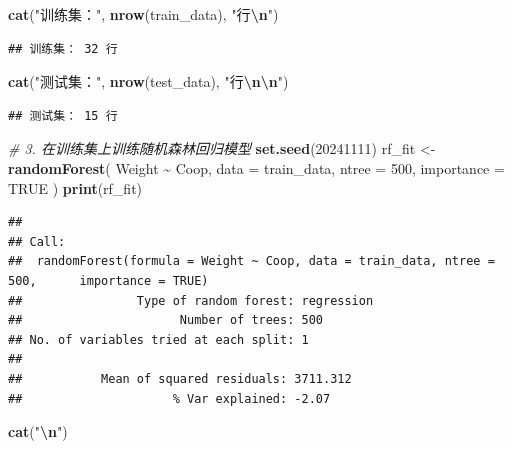 \documentclass[
]{ctexart}
\newenvironment{Shaded}{\begin{snugshade}}{\end{snugshade}}
\newcommand{\AttributeTok}[1]{\textcolor[rgb]{0.13,0.29,0.53}{#1}}
\newcommand{\CommentTok}[1]{\textcolor[rgb]{0.56,0.35,0.01}{\textit{#1}}}
\newcommand{\ConstantTok}[1]{\textcolor[rgb]{0.56,0.35,0.01}{#1}}
\newcommand{\DecValTok}[1]{\textcolor[rgb]{0.00,0.00,0.81}{#1}}
\newcommand{\FunctionTok}[1]{\textcolor[rgb]{0.13,0.29,0.53}{\textbf{#1}}}
\newcommand{\NormalTok}[1]{#1}
\newcommand{\OtherTok}[1]{\textcolor[rgb]{0.56,0.35,0.01}{#1}}
\newcommand{\SpecialCharTok}[1]{\textcolor[rgb]{0.81,0.36,0.00}{\textbf{#1}}}
\newcommand{\StringTok}[1]{\textcolor[rgb]{0.31,0.60,0.02}{#1}}
\begin{document}
\begin{Shaded}
\begin{Highlighting}[]
\FunctionTok{cat}\NormalTok{(}\StringTok{"训练集："}\NormalTok{, }\FunctionTok{nrow}\NormalTok{(train\_data), }\StringTok{"行}\SpecialCharTok{\textbackslash{}n}\StringTok{"}\NormalTok{)}
\end{Highlighting}
\end{Shaded}

\begin{verbatim}
## 训练集： 32 行
\end{verbatim}

\begin{Shaded}
\begin{Highlighting}[]
\FunctionTok{cat}\NormalTok{(}\StringTok{"测试集："}\NormalTok{, }\FunctionTok{nrow}\NormalTok{(test\_data),  }\StringTok{"行}\SpecialCharTok{\textbackslash{}n\textbackslash{}n}\StringTok{"}\NormalTok{)}
\end{Highlighting}
\end{Shaded}

\begin{verbatim}
## 测试集： 15 行
\end{verbatim}

\begin{Shaded}
\begin{Highlighting}[]
\CommentTok{\# 3. 在训练集上训练随机森林回归模型}
\FunctionTok{set.seed}\NormalTok{(}\DecValTok{20241111}\NormalTok{)}
\NormalTok{rf\_fit }\OtherTok{\textless{}{-}} \FunctionTok{randomForest}\NormalTok{(}
\NormalTok{  Weight }\SpecialCharTok{\textasciitilde{}}\NormalTok{ Coop,}
  \AttributeTok{data       =}\NormalTok{ train\_data,}
  \AttributeTok{ntree      =} \DecValTok{500}\NormalTok{,}
  \AttributeTok{importance =} \ConstantTok{TRUE}
\NormalTok{)}
\FunctionTok{print}\NormalTok{(rf\_fit)}
\end{Highlighting}
\end{Shaded}

\begin{verbatim}
## 
## Call:
##  randomForest(formula = Weight ~ Coop, data = train_data, ntree = 500,      importance = TRUE) 
##                Type of random forest: regression
##                      Number of trees: 500
## No. of variables tried at each split: 1
## 
##           Mean of squared residuals: 3711.312
##                     % Var explained: -2.07
\end{verbatim}

\begin{Shaded}
\begin{Highlighting}[]
\FunctionTok{cat}\NormalTok{(}\StringTok{"}\SpecialCharTok{\textbackslash{}n}\StringTok{"}\NormalTok{)}
\end{Highlighting}
\end{Shaded}
\end{document}
